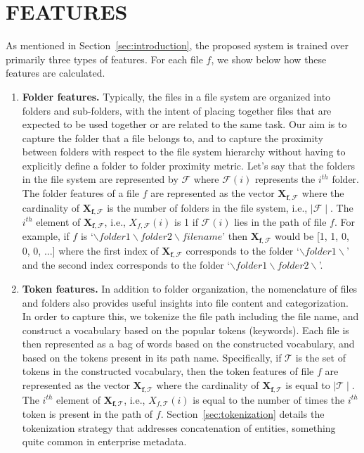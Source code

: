 \section{\uppercase{Features}}
\label{sec:features}
As mentioned in Section~\ref{sec:introduction}, the proposed system is
trained over primarily three types of features. For each file $f$, we
show below how these features are calculated.
\begin{enumerate}
\item \textbf{Folder features.} Typically, the files in a file system
  are organized into folders and sub-folders, with the intent of
  placing together files that are expected to be used together or are
  related to the same task. Our aim is to capture the folder that a
  file belongs to, and to capture the proximity between folders with
  respect to the file system hierarchy without having to explicitly
  define a folder to folder proximity metric. Let's say that the
  folders in the file system are represented by $\mathbf{\mathcal{F}}$
  where $\mathcal{F}(i)$ represents the $i^{th}$ folder. The folder
  features of a file $f$ are represented as the vector
  $\mathbf{X_{f,\mathcal{F}}}$ where the cardinality of
  $\mathbf{X_{f,\mathcal{F}}}$ is the number of folders in the file
  system, i.e., $\mid \mathcal{F} \mid$. The $i^{th}$ element of
  $\mathbf{X_{f,\mathcal{F}}}$, i.e., $X_{f,\mathcal{F}}(i)$ is 1 if
  $\mathcal{F}(i)$ lies in the path of file $f$. For example, if $f$
  is `$\backslash folder1 \backslash folder2 \backslash filename$'
  then $\mathbf{X_{f,\mathcal{F}}}$ would be [1, 1, 0, 0, 0, ...]
  where the first index of $\mathbf{X_{f,\mathcal{F}}}$ corresponds to
  the folder `$\backslash folder1 \backslash$' and the second index
  corresponds to the folder `$\backslash folder1 \backslash folder2
  \backslash$'.
\item \textbf{Token features.}  In addition to folder organization,
  the nomenclature of files and folders also provides useful insights
  into file content and categorization. In order to capture this, we
  tokenize the file path including the file name, and construct a
  vocabulary based on the popular tokens (keywords). Each file is then
  represented as a bag of words based on the constructed vocabulary,
  and based on the tokens present in its path name. Specifically, if
  $\mathcal{T}$ is the set of tokens in the constructed vocabulary,
  then the token features of file $f$ are represented as the vector
  $\mathbf{X_{f,\mathcal{T}}}$ where the cardinality of
  $\mathbf{X_{f,\mathcal{T}}}$ is equal to $\mid \mathcal{T} \mid$.
  The $i^{th}$ element of $\mathbf{X_{f,\mathcal{T}}}$, i.e.,
  $X_{f,\mathcal{T}}(i)$ is equal to the number of times the $i^{th}$
  token is present in the path of $f$.  Section~\ref{sec:tokenization}
  details the tokenization strategy that addresses concatenation of
  entities, something quite common in enterprise metadata.


\end{enumerate}
